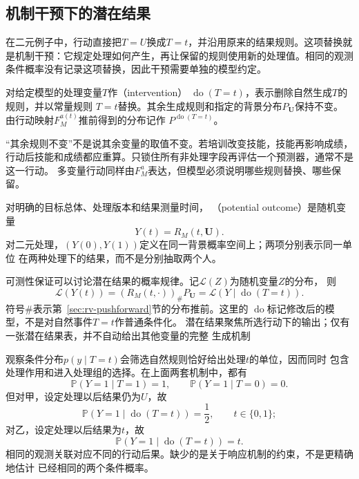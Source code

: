 \subsection{机制干预下的潜在结果}
\label{sec:causal-intervention-potential-outcomes}

在二元例子中，行动直接把\(T=U\)换成\(T=t\)，并沿用原来的结果规则。这项替换就是机制干预：它规定处理如何产生，再让保留的规则使用新的处理值。相同的观测条件概率没有记录这项替换，因此干预需要单独的模型约定。

\begin{definition}[理想干预]
  \label{def:causal-intervention}
  对给定模型的处理变量\(T\)作（intervention）
  \(\operatorname{do}(T=t)\)，表示删除自然生成\(T\)的规则，并以常量规则
  \(T=t\)替换。其余生成规则和指定的背景分布\(P_{\bm U}\)保持不变。
  由行动映射\(F_M^{a(t)}\)推前得到的分布记作
  \(P^{\operatorname{do}(T=t)}\)。
\end{definition}

“其余规则不变”不是说其余变量的取值不变。若培训改变技能，技能再影响成绩，
行动后技能和成绩都应重算。只锁住所有非处理字段再评估一个预测器，通常不是这一行动。
多变量行动同样由\(F_M^a\)表达，但模型必须说明哪些规则替换、哪些保留。

\begin{definition}[潜在结果]
  \label{def:causal-potential-outcomes}
  对明确的目标总体、处理版本和结果测量时间，
  （potential outcome）是随机变量
  \begin{equation}
    Y(t)=R_M(t,\bm U).
    \label{eq:causal-response-potential-outcome}
  \end{equation}
  对二元处理，\((Y(0),Y(1))\)定义在同一背景概率空间上；两项分别表示同一单位
  在两种处理下的结果，而不是分别抽取两个人。
\end{definition}

可测性保证可以讨论潜在结果的概率规律。记\(\mathcal L(Z)\)为随机变量\(Z\)的分布，
则
\[
  \mathcal L(Y(t))
  =
  (R_M(t,\cdot))_{\#}P_{\bm U}
  =
  \mathcal L(Y\mid\operatorname{do}(T=t)).
\]
符号\(\#\)表示第~\ref{sec:rv-pushforward}节的分布推前。这里的
\(\operatorname{do}\)标记修改后的模型，不是对自然事件\(T=t\)作普通条件化。
潜在结果聚焦所选行动下的输出；仅有一张潜在结果表，并不自动给出其他变量的完整
生成机制

观察条件分布\(p(y\mid T=t)\)会筛选自然规则恰好给出处理\(t\)的单位，因而同时
包含处理作用和进入处理组的选择。在上面两套机制中，都有
\[
  \mathbb P(Y=1\mid T=1)=1,\qquad
  \mathbb P(Y=1\mid T=0)=0.
\]
但对甲，设定处理以后结果仍为\(U\)，故
\[
  \mathbb P(Y=1\mid\operatorname{do}(T=t))=\frac12,
  \qquad t\in\{0,1\};
\]
对乙，设定处理以后结果为\(t\)，故
\[
  \mathbb P(Y=1\mid\operatorname{do}(T=t))=t.
\]
相同的观测关联对应不同的行动后果。缺少的是关于响应机制的约束，不是更精确地估计
已经相同的两个条件概率。

